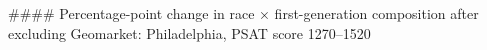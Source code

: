 #### Percentage-point change in race × first-generation composition after excluding Geomarket: Philadelphia, PSAT score 1270–1520
